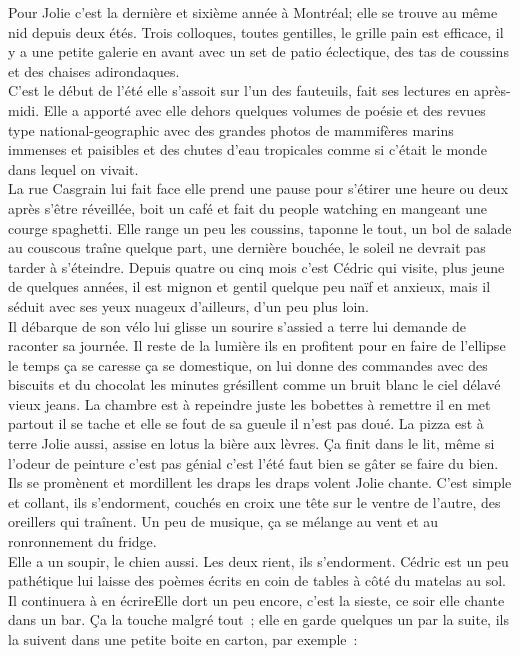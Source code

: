 \documentclass{article}
\begin{document}
Pour Jolie c’est la dernière et sixième année à Montréal; elle se
trouve au même nid depuis deux étés. Trois colloques, toutes
gentilles, le grille pain est efficace, il y a une petite galerie en
avant avec un set de patio éclectique, des tas de coussins et des
chaises adirondaques. \\

C’est le début de l’été elle s’assoit sur l’un
des fauteuils, fait ses lectures en après-midi. Elle a apporté avec
elle dehors quelques volumes de poésie et des revues type
national-geographic avec des grandes photos de mammifères marins
immenses et paisibles et des chutes d’eau tropicales comme si c’était
le monde dans lequel on vivait. \\

La rue Casgrain lui fait face elle
prend une pause pour s’étirer une heure ou deux après s’être
réveillée, boit un café et fait du people watching en mangeant une
courge spaghetti. Elle range un peu les coussins, taponne le tout, un
bol de salade au couscous traîne quelque part, une dernière bouchée,
le soleil ne devrait pas tarder à s’éteindre. Depuis quatre ou cinq
mois c’est Cédric qui visite, plus jeune de quelques années, il est
mignon et gentil quelque peu naïf et anxieux, mais il séduit avec ses
yeux nuageux d’ailleurs, d’un peu plus loin.\\

Il débarque de son vélo lui glisse un sourire s’assied a terre lui
demande de raconter sa journée. Il reste de la lumière ils en
profitent pour en faire de l’ellipse le temps ça se caresse ça se
domestique, on lui donne des commandes avec des biscuits et du
chocolat les minutes grésillent comme un bruit blanc le ciel délavé
vieux jeans. La chambre est à repeindre juste les bobettes à remettre
il en met partout il se tache et elle se fout de sa gueule il n’est
pas doué. La pizza est à terre Jolie aussi, assise en lotus la bière
aux lèvres.  Ça finit dans le lit, même si l’odeur de peinture c’est
pas génial c’est l’été faut bien se gâter se faire du bien. Ils se
promènent et mordillent les draps les draps volent Jolie chante. C’est
simple et collant, ils s’endorment, couchés en croix une tête sur le
ventre de l’autre, des oreillers qui traînent. Un peu de musique, ça
se mélange au vent et au ronronnement du fridge.\\

Elle a un soupir, le chien aussi. Les deux rient, ils s’endorment.
\clearpage
Cédric est un peu pathétique lui laisse des poèmes écrits en coin de
tables à côté du matelas au sol. Il continuera à en écrireElle dort un peu encore, c’est la
sieste, ce soir elle chante dans un bar. Ça la touche malgré tout ;
elle en garde quelques un par la suite, ils la suivent dans une petite
boite en carton, par exemple :\\
\end{document}
